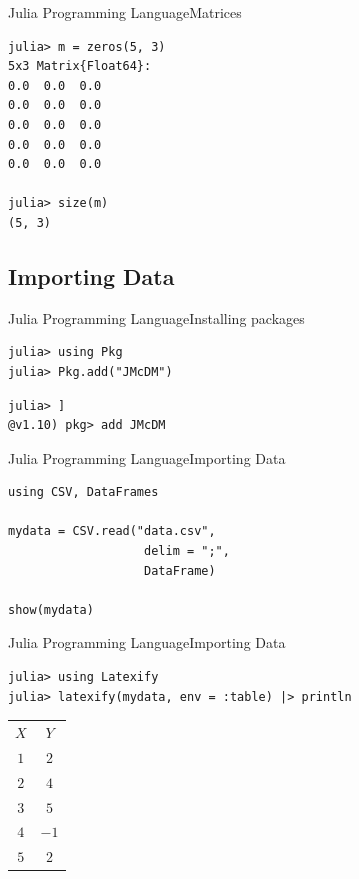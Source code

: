 \documentclass[11pt]{beamer}
\begin{document}
\begin{frame}[fragile]{Julia Programming Language}{Matrices}
\begin{lstlisting}
julia> m = zeros(5, 3)
5x3 Matrix{Float64}:
0.0  0.0  0.0
0.0  0.0  0.0
0.0  0.0  0.0
0.0  0.0  0.0
0.0  0.0  0.0

julia> size(m)
(5, 3)
\end{lstlisting}
\end{frame}

\subsection{Importing Data}

\begin{frame}[fragile]{Julia Programming Language}{Installing packages}
\begin{lstlisting}
julia> using Pkg
julia> Pkg.add("JMcDM")
\end{lstlisting}

\begin{lstlisting}
julia> ]
@v1.10) pkg> add JMcDM
\end{lstlisting}
\end{frame}

\begin{frame}[fragile]{Julia Programming Language}{Importing Data}
\begin{lstlisting}
using CSV, DataFrames

mydata = CSV.read("data.csv", 
				   delim = ";", 
				   DataFrame)

show(mydata)
\end{lstlisting}
\end{frame}


\begin{frame}[fragile]{Julia Programming Language}{Importing Data}
\begin{lstlisting}
julia> using Latexify
julia> latexify(mydata, env = :table) |> println
\end{lstlisting}

\begin{tabular}{cc}
$X$ & $ Y$\\
$1$ & $2$\\
$2$ & $4$\\
$3$ & $5$\\
$4$ & $-1$\\
$5$ & $2$\\
\end{tabular}

\end{frame}
\end{document}
